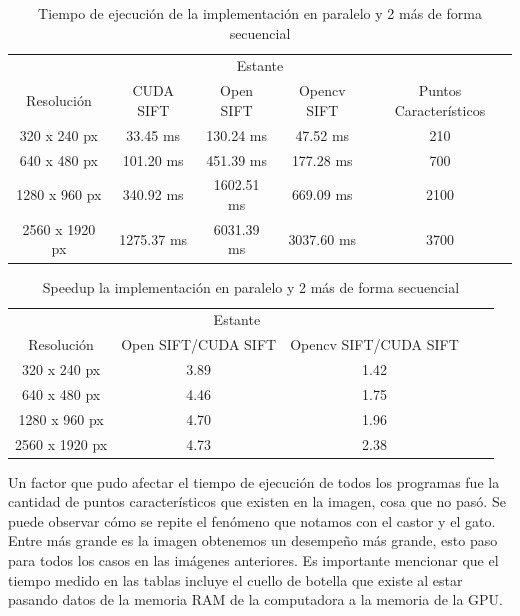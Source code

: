 \begin{table}[phtb]
\centering
\begin{tabular}{|c|c|c|c|c|}
\hline
\multicolumn{5}{|c|}{Estante} \\
\cline{1-5}
Resolución & CUDA SIFT & Open SIFT & Opencv SIFT & Puntos Característicos\\
\hline \hline
 320 x 240 px  & 33.45 ms   & 130.24 ms   & 47.52 ms   & 210\\ \cline{1-5}
 640 x 480 px  & 101.20 ms  &  451.39 ms  & 177.28 ms  & 700\\ \cline{1-5}
1280 x 960 px  & 340.92 ms  &  1602.51 ms & 669.09 ms  & 2100\\ \cline{1-5}
2560 x 1920 px & 1275.37 ms &  6031.39 ms & 3037.60 ms & 3700\\ \cline{1-5}
\end{tabular}
\caption{Tiempo de ejecución de la implementación en paralelo y 2 más de forma secuencial}
\label{tabla:final}
\end{table}
\begin{table}[phtb]
\centering
\begin{tabular}{|c|c|c|c|c|}
\hline
\multicolumn{3}{|c|}{Estante} \\
\cline{1-3}
Resolución & Open SIFT/CUDA SIFT & Opencv SIFT/CUDA SIFT \\
\hline \hline
 320 x 240 px  &  3.89  &  1.42   \\ \cline{1-3}
 640 x 480 px  &  4.46  &  1.75  \\ \cline{1-3}
1280 x 960 px  &  4.70  &  1.96  \\ \cline{1-3}
2560 x 1920 px &  4.73  &  2.38 \\ \cline{1-3}
\end{tabular}
\caption{Speedup la implementación en paralelo y 2 más de forma secuencial}
\label{tabla:final}
\end{table}
\pagebreak
Un factor que pudo afectar el tiempo de ejecución de todos los programas fue la cantidad de puntos característicos que existen en la imagen, cosa que no pasó. Se puede observar cómo se repite el fenómeno que notamos con el castor y el gato. Entre más grande es la imagen obtenemos un desempeño más grande, esto paso para todos los casos en las imágenes anteriores. Es importante mencionar que el tiempo medido en las tablas incluye el cuello de botella que existe al estar pasando datos de la memoria RAM de la computadora a la memoria de la GPU.